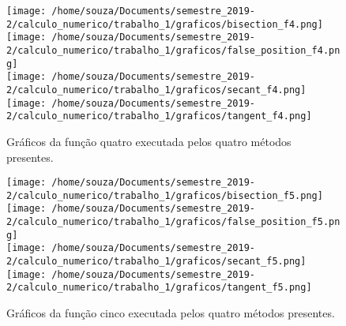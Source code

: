 \documentclass[12pt]{article}
\begin{document}
\begin{figure}[!ht]
    \centering
    \texttt{[image: /home/souza/Documents/semestre\_2019-2/calculo\_numerico/trabalho\_1/graficos/bisection\_f4.png]}
    \texttt{[image: /home/souza/Documents/semestre\_2019-2/calculo\_numerico/trabalho\_1/graficos/false\_position\_f4.png]}\\
    \texttt{[image: /home/souza/Documents/semestre\_2019-2/calculo\_numerico/trabalho\_1/graficos/secant\_f4.png]}
    \texttt{[image: /home/souza/Documents/semestre\_2019-2/calculo\_numerico/trabalho\_1/graficos/tangent\_f4.png]}
    \caption{Gráficos da função quatro executada pelos quatro métodos presentes.}
\end{figure}

\begin{figure}[!ht]
    \centering
    \texttt{[image: /home/souza/Documents/semestre\_2019-2/calculo\_numerico/trabalho\_1/graficos/bisection\_f5.png]}
    \texttt{[image: /home/souza/Documents/semestre\_2019-2/calculo\_numerico/trabalho\_1/graficos/false\_position\_f5.png]}\\
    \texttt{[image: /home/souza/Documents/semestre\_2019-2/calculo\_numerico/trabalho\_1/graficos/secant\_f5.png]}
    \texttt{[image: /home/souza/Documents/semestre\_2019-2/calculo\_numerico/trabalho\_1/graficos/tangent\_f5.png]}
    \caption{Gráficos da função cinco executada pelos quatro métodos presentes.}
\end{figure}
\end{document}
